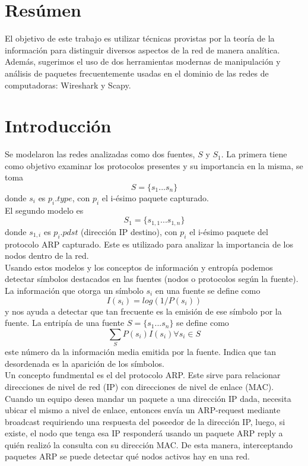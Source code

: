 \section{Resúmen}

El objetivo de este trabajo es utilizar técnicas provistas por la teoría de la información para distinguir diversos aspectos de la red de manera analítica. Además, sugerimos el uso de dos herramientas modernas de manipulación y análisis de paquetes frecuentemente usadas en el dominio de las redes de computadoras: Wireshark y Scapy.

\section{Introducción}
Se modelaron las redes analizadas como dos fuentes, $S$ y $S_1$. La primera tiene como objetivo examinar los protocolos presentes y su importancia en la misma, se toma 
						$$S = \{s_1...s_n\}$$
donde $s_i$ es $p_i.type$, con $p_i$ el i-ésimo paquete capturado.
\\
El segundo modelo es 
						$$S_1 = \{s_{1,1}...s_{1,n}\}$$
donde $s_{1,i}$ es $p_i.pdst$ (dirección IP destino), con $p_i$ el i-ésimo paquete del protocolo ARP capturado. Este es utilizado para analizar la importancia de los nodos dentro de la red. 
\\
	Usando estos modelos y los conceptos de información y entropía podemos detectar símbolos destacados en las fuentes (nodos o protocolos según la fuente). La información que otorga un símbolo $s_i$ en una fuente se define como 
								$$ I (s_i) = log(1/P(s_i)) $$
y nos ayuda a detectar que tan frecuente es la emisión de ese símbolo por la fuente.
La entripía de una fuente $S = \{s_1...s_n\}$ se define como
								$$\sum_{S} P(s_i)I(s_i) \forall{s_i} \in{S}$$
este número da la información media emitida por la fuente. Indica que tan desordenada es la aparición de los símbolos.
\\

Un concepto fundmental es el del protocolo ARP. Este sirve para relacionar direcciones de nivel de red (IP) con direcciones de nivel de enlace (MAC). Cuando un equipo desea mandar un paquete a una dirección IP dada, necesita ubicar el mismo a nivel de enlace, entonces envía un ARP-request mediante broadcast requiriendo una respuesta del poseedor de la dirección IP, luego, si existe, el nodo que tenga esa IP responderá usando un paquete ARP reply a quién realizó la consulta con su dirección MAC. De esta manera, interceptando paquetes ARP se puede detectar qué nodos activos hay en una red. 		
